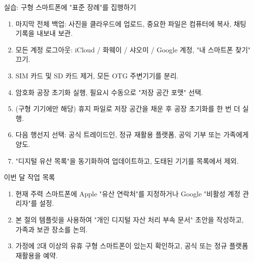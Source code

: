 \begin{tcbpractice}{실습: 구형 스마트폰에 "표준 장례"를 집행하기}
\begin{enumerate}
  \item 마지막 전체 백업: 사진을 클라우드에 업로드, 중요한 파일은 컴퓨터에 복사, 채팅 기록을 내보내 보관.
  \item 모든 계정 로그아웃: iCloud / 화웨이 / 샤오미 / Google 계정, "내 스마트폰 찾기" 끄기.
  \item SIM 카드 및 SD 카드 제거, 모든 OTG 주변기기를 분리.
  \item 암호화 공장 초기화 실행, 필요시 수동으로 "저장 공간 포맷" 선택.
  \item (구형 기기에만 해당) 휴지 파일로 저장 공간을 채운 후 공장 초기화를 한 번 더 실행.
  \item 다음 행선지 선택: 공식 트레이드인, 정규 재활용 플랫폼, 공익 기부 또는 가족에게 양도.
  \item "디지털 유산 목록"을 동기화하여 업데이트하고, 도태된 기기를 목록에서 제외.
\end{enumerate}

\end{tcbpractice}

\begin{tcbpractice}{이번 달 작업 목록}
\begin{enumerate}
  \item 현재 주력 스마트폰에 Apple "유산 연락처"를 지정하거나 Google "비활성 계정 관리자"를 설정.
  \item 본 절의 템플릿을 사용하여 "개인 디지털 자산 처리 부속 문서" 초안을 작성하고, 가족과 보관 장소를 논의.
  \item 가정에 2대 이상의 유휴 구형 스마트폰이 있는지 확인하고, 공식 또는 정규 플랫폼 재활용을 예약.
\end{enumerate}

\end{tcbpractice}
